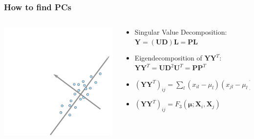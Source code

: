 \documentclass[11pt]{beamer}
\newcommand{\MX}{\mathbf{X}} %
\newcommand{\MY}{\mathbf{Y}} %
\newcommand{\MP}{\mathbf{P}} %
\newcommand{\MEAN}{\boldsymbol{\mu}} %
\begin{document}
\begin{frame}
\frametitle{How to find PCs}
\begin{columns}
\begin{column}{0.4\textwidth}
	\includegraphics[width=\textwidth]{figures/pca3.pdf}
\end{column}
\begin{column}{0.6\textwidth}
	\begin{itemize}
		\item<1-> Singular Value Decomposition: $\MY = (\mathbf{U}\mathbf{D})\mathbf{L} = \mathbf{P}\mathbf{L}$
		\item<2-> Eigendecomposition of $\MY\MY^T$: $\MY\MY^T = \mathbf{U}\mathbf{D}^2\mathbf{U}^T = \MP\MP^T$
		\only<3>{\item $(\MY\MY^T)_{ij}$}
		\item<4-> $(\MY\MY^T)_{ij} = \sum_l (x_{il} - \mu_l)(x_{jl} - \mu_l)$
		\item<5-> $(\MY\MY^T)_{ij} = F_3(\MEAN; \MX_i, \MX_j)$
	\end{itemize}
\end{column}			
\end{columns}
\vspace{30px}
\end{frame}
\end{document}
